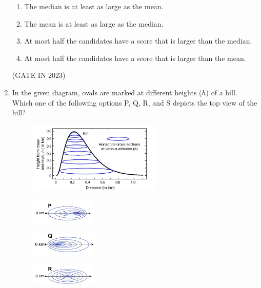 \documentclass[journal]{IEEEtran}
\begin{document}
\begin{enumerate}
    \begin{enumerate}
        \item The median is at least as large as the mean.
        \item The mean is at least as large as the median.
        \item At most half the candidates have a score that is larger than the median.
        \item At most half the candidates have a score that is larger than the mean.
    \end{enumerate}
    \hfill(GATE IN 2023)

    \item In the given diagram, ovals are marked at different heights ($h$) of a hill. Which one of the following options P, Q, R, and S depicts the top view of the hill?
    \begin{figure}[H]
    \centering
      \includegraphics[width=0.6\textwidth]{1.png} 
      \caption{}
    \label{fig:fig1} 
    \end{figure}
    \begin{multicols}{2}
    \begin{figure}[H]
      \includegraphics[width=0.3\textwidth]{2.png} 
      \caption{}
    \label{fig:fig2} 
\end{figure}
\begin{figure}[H]
      \includegraphics[width=0.3\textwidth]{3.png} 
      \caption{}
    \label{fig:fig3} 
\end{figure}
\begin{figure}[H]
      \includegraphics[width=0.3\textwidth]{4.png} 

\end{figure}
\end{multicols}
\end{enumerate}
\end{document}
